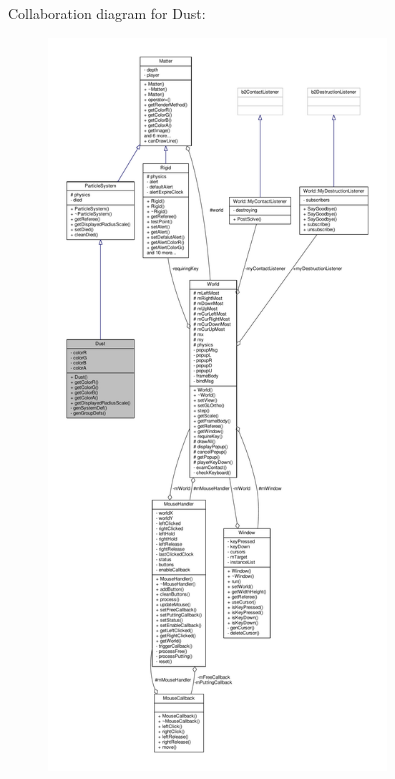 Collaboration diagram for Dust\+:
\nopagebreak
\begin{figure}[H]
\begin{center}
\leavevmode
\includegraphics[height=550pt]{classDust__coll__graph}
\end{center}
\end{figure}
